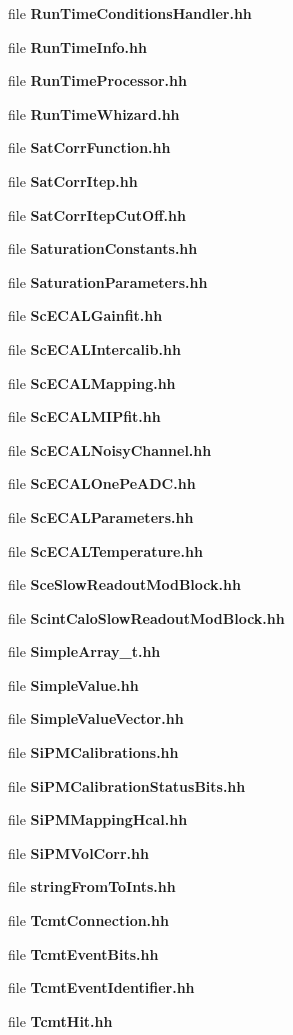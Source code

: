 \begin{DoxyCompactItemize}
file {\bfseries RunTimeConditionsHandler.hh}
\item 
file {\bfseries RunTimeInfo.hh}
\item 
file {\bfseries RunTimeProcessor.hh}
\item 
file {\bfseries RunTimeWhizard.hh}
\item 
file {\bfseries SatCorrFunction.hh}
\item 
file {\bfseries SatCorrItep.hh}
\item 
file {\bfseries SatCorrItepCutOff.hh}
\item 
file {\bfseries SaturationConstants.hh}
\item 
file {\bfseries SaturationParameters.hh}
\item 
file {\bfseries ScECALGainfit.hh}
\item 
file {\bfseries ScECALIntercalib.hh}
\item 
file {\bfseries ScECALMapping.hh}
\item 
file {\bfseries ScECALMIPfit.hh}
\item 
file {\bfseries ScECALNoisyChannel.hh}
\item 
file {\bfseries ScECALOnePeADC.hh}
\item 
file {\bfseries ScECALParameters.hh}
\item 
file {\bfseries ScECALTemperature.hh}
\item 
file {\bfseries SceSlowReadoutModBlock.hh}
\item 
file {\bfseries ScintCaloSlowReadoutModBlock.hh}
\item 
file {\bfseries SimpleArray\_\-t.hh}
\item 
file {\bfseries SimpleValue.hh}
\item 
file {\bfseries SimpleValueVector.hh}
\item 
file {\bfseries SiPMCalibrations.hh}
\item 
file {\bfseries SiPMCalibrationStatusBits.hh}
\item 
file {\bfseries SiPMMappingHcal.hh}
\item 
file {\bfseries SiPMVolCorr.hh}
\item 
file {\bfseries stringFromToInts.hh}
\item 
file {\bfseries TcmtConnection.hh}
\item 
file {\bfseries TcmtEventBits.hh}
\item 
file {\bfseries TcmtEventIdentifier.hh}
\item 
file {\bfseries TcmtHit.hh}
\item 

\end{DoxyCompactItemize}
